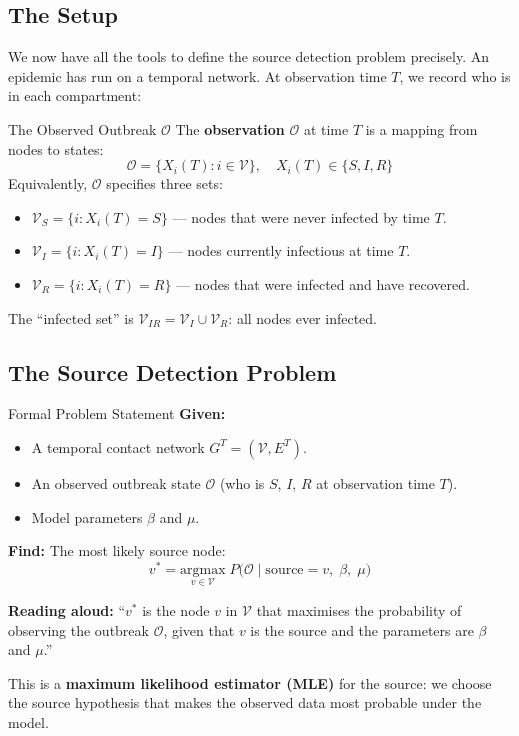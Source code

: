 \subsection{The Setup}

We now have all the tools to define the source detection problem precisely. An epidemic has run on a temporal network. At observation time $T$, we record who is in each compartment:

\begin{conceptbox}{The Observed Outbreak $\mathcal{O}$}
The \textbf{observation} $\mathcal{O}$ at time $T$ is a mapping from nodes to states:
\[
\mathcal{O} = \{X_i(T) : i \in \mathcal{V}\}, \quad X_i(T) \in \{S, I, R\}
\]
Equivalently, $\mathcal{O}$ specifies three sets:
\begin{itemize}[noitemsep]
    \item $\mathcal{V}_S = \{i : X_i(T) = S\}$ --- nodes that were never infected by time $T$.
    \item $\mathcal{V}_I = \{i : X_i(T) = I\}$ --- nodes currently infectious at time $T$.
    \item $\mathcal{V}_R = \{i : X_i(T) = R\}$ --- nodes that were infected and have recovered.
\end{itemize}
The ``infected set'' is $\mathcal{V}_{IR} = \mathcal{V}_I \cup \mathcal{V}_R$: all nodes ever infected.
\end{conceptbox}

\subsection{The Source Detection Problem}

\begin{conceptbox}{Formal Problem Statement}
\textbf{Given:}
\begin{itemize}[noitemsep]
    \item A temporal contact network $G^T = (\mathcal{V}, E^T)$.
    \item An observed outbreak state $\mathcal{O}$ (who is $S$, $I$, $R$ at observation time $T$).
    \item Model parameters $\beta$ and $\mu$.
\end{itemize}

\textbf{Find:} The most likely source node:
\begin{equation}
    v^* = \underset{v \in \mathcal{V}}{\mathrm{argmax}} \; P\bigl(\mathcal{O} \mid \text{source} = v,\; \beta,\; \mu\bigr)
    \label{eq:source_detection}
\end{equation}

\textbf{Reading aloud:} ``$v^*$ is the node $v$ in $\mathcal{V}$ that maximises the probability of observing the outbreak $\mathcal{O}$, given that $v$ is the source and the parameters are $\beta$ and $\mu$.''

This is a \textbf{maximum likelihood estimator (MLE)} for the source: we choose the source hypothesis that makes the observed data most probable under the model.
\end{conceptbox}

